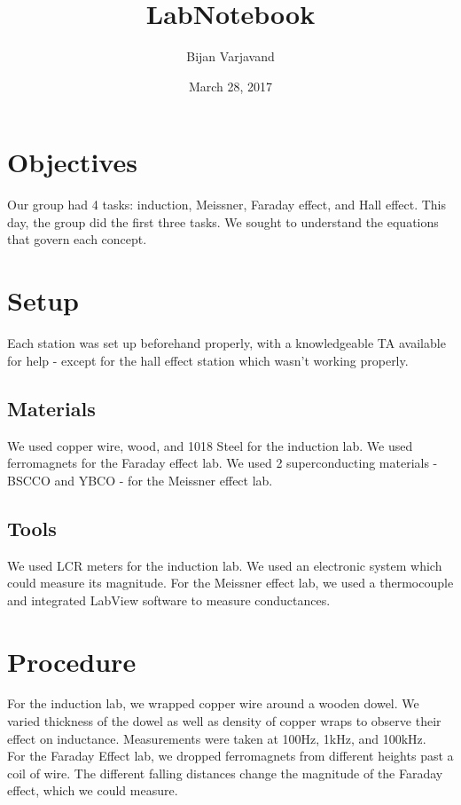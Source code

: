 \documentclass{article}
\author{Bijan Varjavand}
\title{LabNotebook}
\date{March 28, 2017}
\begin{document}
\maketitle

\section{Objectives}

Our group had 4 tasks: induction, Meissner, Faraday effect, and Hall effect. This day, the group did the first three tasks. We sought to understand the equations that govern each concept.

\section{Setup}

Each station was set up beforehand properly, with a knowledgeable TA available for help - except for the hall effect station which wasn't working properly.

\subsection{Materials}

We used copper wire, wood, and 1018 Steel for the induction lab. We used ferromagnets for the Faraday effect lab. We used 2 superconducting materials - BSCCO and YBCO - for the Meissner effect lab.

\subsection{Tools}

We used LCR meters for the induction lab. We used an electronic system which could measure its magnitude. For the Meissner effect lab, we used a thermocouple and integrated LabView software to measure conductances.

\section{Procedure}

For the induction lab, we wrapped copper wire around a wooden dowel. We varied thickness of the dowel as well as density of copper wraps to observe their effect on inductance. Measurements were taken at 100Hz, 1kHz, and 100kHz.\\

For the Faraday Effect lab, we dropped ferromagnets from different heights past a coil of wire. The different falling distances change the magnitude of the Faraday effect, which we could measure.\\
\end{document}
